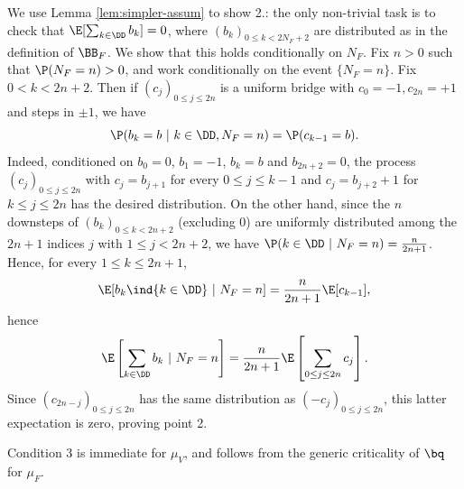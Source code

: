 \documentclass[10pt,a4paper]{article}
\DeclareMathOperator{\Var}{Var}
\begin{document}
We use Lemma \ref{lem:simpler-assum} to show 2.: the only non-trivial task is to check that $\E[\sum_{k\in\DD} b_k] = 0$, where $(b_k)_{0\leq k < 2N_F+2}$ are distributed as in the definition of $\BB_F$. We show that this holds conditionally on $N_F$. Fix $n>0$ such that $\P(N_F=n)>0$, and work conditionally on the event $\{N_F = n\}$. Fix $0<k<2n+2$. Then if $(c_j)_{0\leq j \leq 2n}$ is a uniform bridge with $c_0 = -1, c_{2n} = +1$ and steps in $\pm 1$, we have 
\[ \P(b_k = b \ | \ k\in\DD, N_F=n) = \P(c_{k-1}=b) . \]
Indeed, conditioned on $b_0 = 0$, $b_1 = -1$, $b_k = b$ and $b_{2n+2}=0$, the process $(c_j)_{0\leq j \leq 2n}$ with $c_j = b_{j+1}$ for every $0\leq j \leq k-1$ and $c_j = b_{j+2}+1$ for $k\leq j \leq 2n$ has the desired distribution. On the other hand, since the $n$ downsteps of $(b_k)_{0\leq k < 2n+2}$ (excluding 0) are uniformly distributed among the $2n+1$ indices $j$ with $1\leq j <2n+2$, we have $\P(k\in\DD \ | \ N_F=n) = \frac{n}{2n+1}$. Hence, for every $1\leq k \leq 2n+1$, 
\[ \E[b_k \ind{k\in\DD} \ | \ N_F=n] = \frac{n}{2n+1} \E[c_{k-1}] , \]
hence 
\[ \E\left[\sum_{k\in\DD} b_k \ | \ N_F=n\right] = \frac{n}{2n+1} \E\left[ \sum_{0\leq j \leq 2n} c_j \right] . \]
Since $(c_{2n-j})_{0\leq j\leq 2n}$ has the same distribution as $(-c_j)_{0\leq j \leq 2n}$, this latter expectation is zero, proving point 2. 


Condition 3 is immediate for $\mu_V$, and follows from the generic criticality of $\bq$ for $\mu_F$. 


\end{document}
